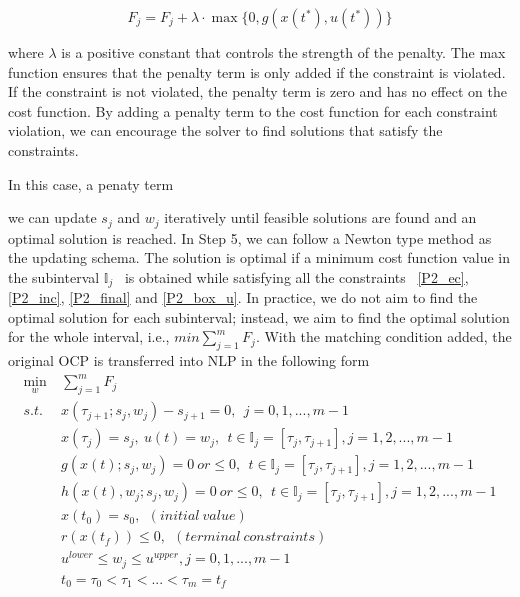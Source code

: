 \documentclass  [
  paper    = a4,
  BCOR     = 10mm,
  twoside,
  fontsize = 12pt,
  fleqn,
  toc      = bibnumbered,
  toc      = listofnumbered,
  numbers  = noendperiod,
  headings = normal,
  listof   = leveldown,
  version  = 3.03
]                                       {scrreprt}
\newcommand{\<}{\langle}
\renewcommand{\>}{\rangle}
\begin{document}
$$F_j = F_j + \lambda \cdot \max\{0, g(x(t^*), u(t^*))\}$$

where $\lambda$ is a positive constant that controls the strength of the penalty. The max function ensures that the penalty term is only added if the constraint is violated. If the constraint is not violated, the penalty term is zero and has no effect on the cost function. By adding a penalty term to the cost function for each constraint violation, we can encourage the solver to find solutions that satisfy the constraints.



 In this case, a penaty term


we can update $s_j$ and $w_j$ iteratively until feasible solutions are found and an optimal solution is reached. In Step 5, we can follow a Newton type method as the updating schema. The solution is optimal if a minimum cost function value in the subinterval $\mathbb{I}_j$  is obtained while satisfying all the constraints  \ref{P2_ec}, \ref{P2_inc}, \ref{P2_final} and \ref{P2_box_u}. In practice, we do not aim to find the optimal solution for each subinterval; instead, we aim to find the optimal solution for the whole interval, i.e., $min  \sum_{j=1}^{m} F_j $. With the matching condition added, the original OCP is transferred into NLP in the following form
	\begin{subequations}
	\begin{align}
		\underset{w}{\text{min}}   \ &  \sum_{j=1}^{m} F_j   \label{P3_obj}   \\
		s.t. \ \ & x(\tau_{j+1}; s_j, w_j) - s_{j+1} = 0,   \ \  j = 0, 1, ...,m -1 \label{P3_eq}  \\
		& x(\tau_j) = s_j, \  u(t) = w_j, \ \  t \in \mathbb{I}_j =[\tau_j, \tau_{j+1}], j = 1, 2, ... , m-1 \\
		 &  g(x(t); s_j, w_j)  = 0 \  or \leq 0,     \ \  t \in \mathbb{I}_j =[\tau_j, \tau_{j+1}], j = 1, 2, ... , m-1 \\
		 & h(x(t),w_j; s_j, w_j) = 0 \  or \leq 0,    \ \  t \in \mathbb{I}_j =[\tau_j, \tau_{j+1}], j = 1, 2, ... , m-1   \\
    	& x(t_0) = s_0, \ \ (initial \ value) \\
	& r(x(t_f)) \leq 0, \ \ (terminal \ constraints) \\
	& u^{lower} \leq w_j \leq u^{upper} ,   j = 0, 1, ... , m-1 \\ 
		         &   t_0 = \tau_0 < \tau_1 < ... < \tau_m = t_f 
	\end{align}
	\label{P3_MSNLP}
\end{subequations}  
\end{document}
